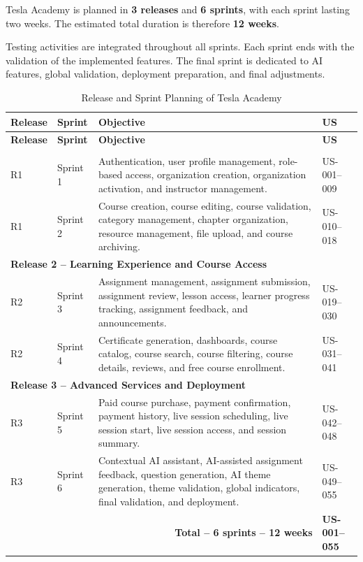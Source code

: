 Tesla Academy is planned in \textbf{3 releases} and \textbf{6 sprints}, with each sprint
lasting two weeks. The estimated total duration is therefore \textbf{12 weeks}.

Testing activities are integrated throughout all sprints. Each sprint ends with the
validation of the implemented features. The final sprint is dedicated to AI features,
global validation, deployment preparation, and final adjustments.

\begingroup
\footnotesize
\setlength{\tabcolsep}{4pt}

\begin{longtable}{|p{1.6cm}|p{2.2cm}|p{7.4cm}|p{2.2cm}|}
\caption{Release and Sprint Planning of Tesla Academy}
\label{tab:release_planning} \\
\hline
\textbf{Release} & \textbf{Sprint} & \textbf{Objective} & \textbf{US} \\
\hline
\endfirsthead

\hline
\textbf{Release} & \textbf{Sprint} & \textbf{Objective} & \textbf{US} \\
\hline
\endhead

\hline
\endfoot

\multicolumn{4}{|l|}{\textbf{Release 1 -- Foundation and Core Management}} \\
\hline
R1 & Sprint 1 & Authentication, user profile management, role-based access, organization creation, organization activation, and instructor management. & US-001--009 \\
\hline
R1 & Sprint 2 & Course creation, course editing, course validation, category management, chapter organization, resource management, file upload, and course archiving. & US-010--018 \\
\hline

\multicolumn{4}{|l|}{\textbf{Release 2 -- Learning Experience and Course Access}} \\
\hline
R2 & Sprint 3 & Assignment management, assignment submission, assignment review, lesson access, learner progress tracking, assignment feedback, and announcements. & US-019--030 \\
\hline
R2 & Sprint 4 & Certificate generation, dashboards, course catalog, course search, course filtering, course details, reviews, and free course enrollment. & US-031--041 \\
\hline

\multicolumn{4}{|l|}{\textbf{Release 3 -- Advanced Services and Deployment}} \\
\hline
R3 & Sprint 5 & Paid course purchase, payment confirmation, payment history, live session scheduling, live session start, live session access, and session summary. & US-042--048 \\
\hline
R3 & Sprint 6 & Contextual AI assistant, AI-assisted assignment feedback, question generation, AI theme generation, theme validation, global indicators, final validation, and deployment. & US-049--055 \\
\hline

\multicolumn{3}{|r|}{\textbf{Total -- 6 sprints -- 12 weeks}}
& \textbf{US-001--055} \\
\hline

\end{longtable}
\endgroup

